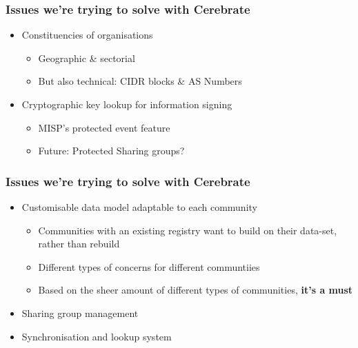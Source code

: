 \begin{frame}
\frametitle{Issues we're trying to solve with Cerebrate}
    \begin{itemize}
        \item Constituencies of organisations
        \begin{itemize}
            \item Geographic \& sectorial
            \item But also technical: CIDR blocks \& AS Numbers
        \end{itemize}
        \item Cryptographic key lookup for information signing
        \begin{itemize}
            \item MISP's protected event feature
            \item Future: Protected Sharing groups? 
        \end{itemize}
    \end{itemize}
\end{frame}

\begin{frame}
\frametitle{Issues we're trying to solve with Cerebrate}
    \begin{itemize}
        \item Customisable data model adaptable to each community
        \begin{itemize}
            \item Communities with an existing registry want to build on their data-set, rather than rebuild
            \item Different types of concerns for different communtiies
            \item Based on the sheer amount of different types of communities, \textbf{it's a must}
        \end{itemize}
        \item Sharing group management
        \item Synchronisation and lookup system
    \end{itemize}
\end{frame}

